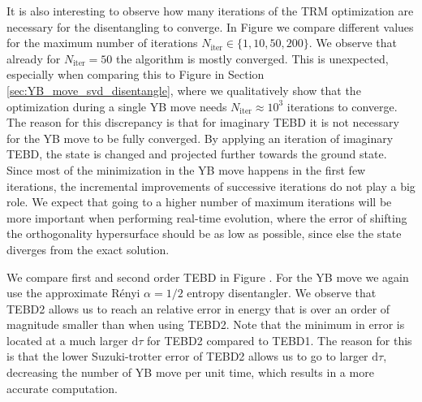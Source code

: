 %

%
It is also interesting to observe how many iterations of the TRM optimization are necessary for the disentangling to converge. In Figure  we compare different values for the maximum number of iterations $N_\text{iter} \in \{1, 10, 50, 200\}$. We observe that already for $N_\text{iter} = 50$ the algorithm is mostly converged. This is unexpected, especially when comparing this to Figure  in Section \ref{sec:YB_move_svd_disentangle}, where we qualitatively show that the optimization during a single YB move needs $N_\text{iter} \approx 10^{3}$ iterations to converge. The reason for this discrepancy is that for imaginary TEBD it is not necessary for the YB move to be fully converged. By applying an iteration of imaginary TEBD, the state is changed and projected further towards the ground state. Since most of the minimization in the YB move happens in the first few iterations, the incremental improvements of successive iterations do not play a big role. We expect that going to a higher number of maximum iterations will be more important when performing real-time evolution, where the error of shifting the orthogonality hypersurface should be as low as possible, since else the state diverges from the exact solution. \par

We compare first and second order TEBD in Figure . For the YB move we again use the approximate Rényi $\alpha=1/2$ entropy disentangler. We observe that TEBD2 allows us to reach an relative error in energy that is over an order of magnitude smaller than when using TEBD2. Note that the minimum in error is located at a much larger $\text{d}\tau$ for TEBD2 compared to TEBD1. The reason for this is that the lower Suzuki-trotter error of TEBD2 allows us to go to larger $\text{d}\tau$, decreasing the number of YB move per unit time, which results in a more accurate computation. \par
%




%
